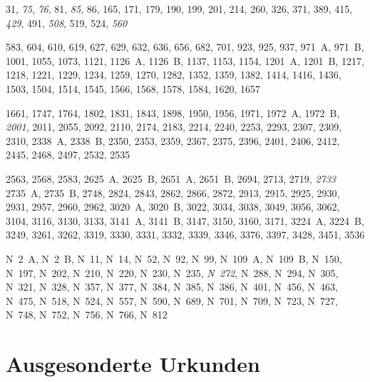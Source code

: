 {%
\setlength{\columnsep}{35pt} %
\raggedright
\begin{multicols}{2}
\begin{description}[
	font=\normalfont,
	labelsep=\fontdimen2\font,
	leftmargin=1.4cm, %
]
\item[\cite{cao1},] 31, \emph{75}, \emph{76}, 81, \emph{85}, 86, 165, 171, 179,
190, 199, 201, 214, 260, 326, 371, 389, 415, \emph{429}, 491, \emph{508}, 519,
524, \emph{560}

\item[\cite{cao2},] 583, 604, 610, 619, 627, 629, 632, 636, 656, 682, 701, 923,
925, 937, 971~A, 971~B, 1001, 1055, 1073, 1121, 1126~A, 1126~B, 1137, 1153,
1154, 1201~A, 1201~B, 1217, 1218, 1221, 1229, 1234, 1259, 1270, 1282, 1352,
1359, 1382, 1414, 1416, 1436, 1503, 1504, 1514, 1545, 1566, 1568, 1578, 1584,
1620, 1657

\item[\cite{cao3},] 1661, 1747, 1764, 1802, 1831, 1843, 1898, 1950, 1956, 1971,
1972~A, 1972~B, \emph{2001}, 2011, 2055, 2092, 2110, 2174, 2183, 2214, 2240,
2253, 2293, 2307, 2309, 2310, 2338~A, 2338~B, 2350, 2353, 2359, 2367, 2375,
2396, 2401, 2406, 2412, 2445, 2468, 2497, 2532, 2535

\item[\cite{cao4},] 2563, 2568, 2583, 2625~A, 2625~B, 2651~A, 2651~B, 2694, 2713,
2719, \emph{2733} 2735~A, 2735~B, 2748, 2824, 2843, 2862, 2866, 2872, 2913,
2915, 2925, 2930, 2931, 2957, 2960, 2962, 3020~A, 3020~B, 3022, 3034, 3038,
3049, 3056, 3062, 3104, 3116, 3130, 3133, 3141~A, 3141~B, 3147, 3150, 3160,
3171, 3224~A, 3224~B, 3249, 3261, 3262, 3319, 3330, 3331, 3332, 3339, 3346,
3376, 3397, 3428, 3451, 3536

\item[\cite{cao5},] N~2~A, N~2~B, N~11, N~14, N~52, N~92, N~99, N~109~A,
N~109~B, N~150, N~197, N~202, N~210, N~220, N~230, N~235, \emph{N~272}, N~288,
N~294, N~305, N~321, N~328, N~357, N~377, N~384, N~385, N~386, N~401, N~456,
N~463, N~475, N~518, N~524, N~557, N~590, N~689, N~701, N~709, N~723, N~727,
N~748, N~752, N~756, N~766, N~812
\end{description}
\end{multicols}
}

\section{Ausgesonderte Urkunden}
\label{subsec:ausgesurk}

